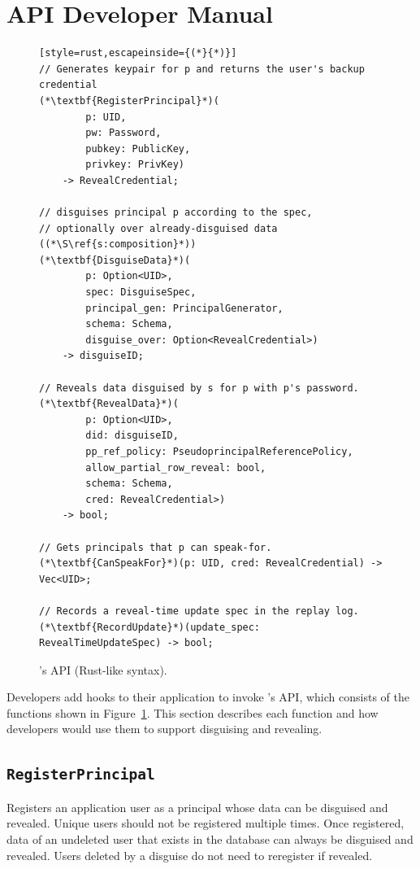 %
\section{API Developer Manual}
\label{s:api}

\begin{figure}[t]
\begin{lstlisting}[style=rust,escapeinside={(*}{*)}]
// Generates keypair for p and returns the user's backup credential
(*\textbf{RegisterPrincipal}*)(
        p: UID, 
        pw: Password,
        pubkey: PublicKey, 
        privkey: PrivKey)
    -> RevealCredential;

// disguises principal p according to the spec, 
// optionally over already-disguised data ((*\S\ref{s:composition}*))
(*\textbf{DisguiseData}*)(
        p: Option<UID>, 
        spec: DisguiseSpec,
        principal_gen: PrincipalGenerator,
        schema: Schema,
        disguise_over: Option<RevealCredential>) 
    -> disguiseID;

// Reveals data disguised by s for p with p's password. 
(*\textbf{RevealData}*)(
        p: Option<UID>, 
        did: disguiseID, 
        pp_ref_policy: PseudoprincipalReferencePolicy,
        allow_partial_row_reveal: bool,
        schema: Schema,
        cred: RevealCredential>)
    -> bool;

// Gets principals that p can speak-for.
(*\textbf{CanSpeakFor}*)(p: UID, cred: RevealCredential) -> Vec<UID>;

// Records a reveal-time update spec in the replay log.
(*\textbf{RecordUpdate}*)(update_spec: RevealTimeUpdateSpec) -> bool;
\end{lstlisting}
\caption{\sys's API (Rust-like syntax).}
\label{f:api-high}
\end{figure}
%

Developers add hooks to their application to invoke \sys's API, which consists
of the functions shown in Figure~\ref{f:api-high}. This section describes each
function and how developers would use them to support disguising and revealing.
    

\subsection{\texttt{RegisterPrincipal}}

    Registers an application user as a principal whose data can be disguised and
    revealed. Unique users should not be registered multiple times.  Once
    registered, data of an undeleted user that exists in the database can always
    be disguised and revealed.
    Users deleted by a disguise do not need to reregister if revealed.

